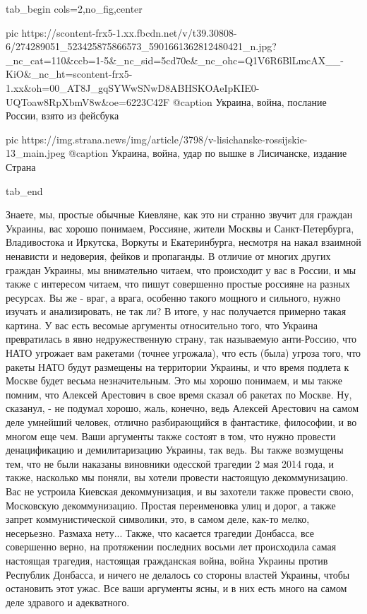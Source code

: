 \ifcmt
  tab_begin cols=2,no_fig,center

     pic https://scontent-frx5-1.xx.fbcdn.net/v/t39.30808-6/274289051_523425875866573_5901661362812480421_n.jpg?_nc_cat=110&ccb=1-5&_nc_sid=5cd70e&_nc_ohc=Q1V6R6BlLmcAX__-KiO&_nc_ht=scontent-frx5-1.xx&oh=00_AT8J_gqSYWwSNwD8ABHSKOAeIpKIE0-UQToaw8RpXbmV8w&oe=6223C42F
		 @caption Украина, война, послание России, взято из фейсбука

		 pic https://img.strana.news/img/article/3798/v-lisichanske-rossijskie-13_main.jpeg
		 @caption Украина, война, удар по вышке в Лисичанске, издание Страна

  tab_end
\fi

Знаете, мы, простые обычные Киевляне, как это ни странно звучит для граждан
Украины, вас хорошо понимаем, Россияне, жители Москвы и Санкт-Петербурга,
Владивостока и Иркутска, Воркуты и Екатеринбурга, несмотря на накал взаимной
ненависти и недоверия, фейков и пропаганды. В отличие от многих других граждан
Украины, мы внимательно читаем, что происходит у вас в России, и мы также с
интересом читаем, что пишут совершенно простые россияне на разных ресурсах. Вы
же - враг, а врага, особенно такого мощного и сильного, нужно изучать и
анализировать, не так ли? В итоге, у нас получается примерно такая картина. У
вас есть весомые аргументы относительно того, что Украина превратилась в явно
недружественную страну, так называемую анти-Россию, что НАТО угрожает вам
ракетами (точнее угрожала), что есть (была) угроза того, что ракеты НАТО будут
размещены на территории Украины, и что время подлета к Москве будет весьма
незначительным. Это мы хорошо понимаем, и мы также помним, что Алексей
Арестович в свое время сказал об ракетах по Москве.  Ну, сказанул, - не подумал
хорошо, жаль, конечно, ведь Алексей Арестович на самом деле умнейший человек,
отлично разбирающийся в фантастике, философии, и во многом еще чем. Ваши
аргументы также состоят в том, что нужно провести денацификацию и
демилитаризацию Украины, так ведь. Вы также возмущены тем, что не были наказаны
виновники одесской трагедии 2 мая 2014 года, и также, насколько мы поняли, вы
хотели провести настоящую декоммунизацию. Вас не устроила Киевская
декоммунизация, и вы захотели также провести свою, Московскую декоммунизацию.
Простая переименовка улиц и дорог, а также запрет коммунистической символики,
это, в самом деле, как-то мелко, несерьезно.  Размаха нету... Также, что
касается трагедии Донбасса, все совершенно верно, на протяжении последних
восьми лет происходила самая настоящая трагедия, настоящая гражданская война,
война Украины против Республик Донбасса, и ничего не делалось со стороны
властей Украины, чтобы остановить этот ужас. Все ваши аргументы ясны, и в них
есть много на самом деле здравого и
адекватного.

